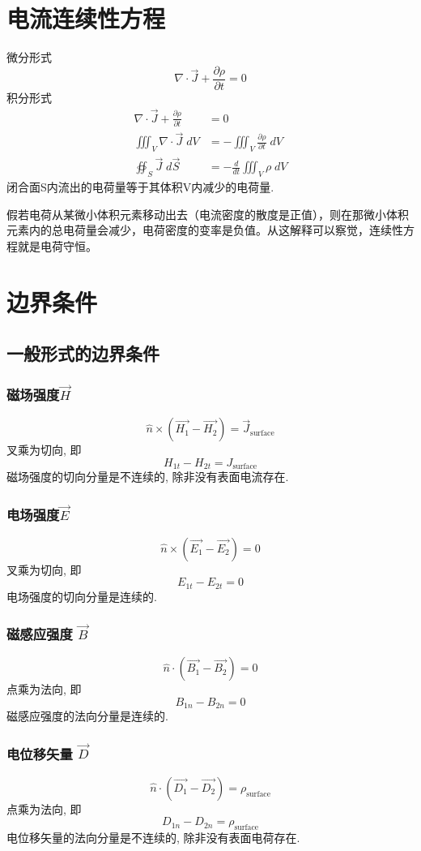 \documentclass[a4paper]{report}
\begin{document}
\section{电流连续性方程}
微分形式
$$\nabla\cdot \vec{J}+ \frac{\partial \rho }{\partial t}=0$$
积分形式
\begin{align*}
    \nabla\cdot \vec{J}+ \frac{\partial \rho }{\partial t}&=0\\
    \iiint_V \nabla\cdot \vec{J} \; dV&=-\iiint_V \frac{\partial \rho }{\partial t} \; dV\\
    \oiint_S \vec{J} \; d\vec{S}&=- \frac{d }{d t}\iiint_V \rho \; dV
\end{align*}
闭合面S内流出的电荷量等于其体积V内减少的电荷量. 
\par 假若电荷从某微小体积元素移动出去（电流密度的散度是正值），则在那微小体积元素内的总电荷量会减少，电荷密度的变率是负值。从这解释可以察觉，连续性方程就是电荷守恒。
\section{边界条件}
\subsection{一般形式的边界条件}
\subsubsection{磁场强度$\vec{H } $}
$$
\hat{n}\times (\vec{H_1}-\vec{H _2}  )=\vec{J}_{\text{surface}}
$$
叉乘为切向, 即
$$H_{1t}-H_{2t}=J_{\text{surface}}$$
磁场强度的切向分量是不连续的, 除非没有表面电流存在. 
\subsubsection{电场强度$\vec{E } $}
$$\hat{n}\times(\vec{E _1}-\vec{E _2}  )=0$$
叉乘为切向, 即
$$E_{1t}-E_{2t}=0$$
电场强度的切向分量是连续的. 
\subsubsection{磁感应强度 $\vec{B }$ }
$$\hat{n}\cdot(\vec{B _1}-\vec{B _2}  )=0$$
点乘为法向, 即
$$B_{1n}-B_{2n}=0$$
磁感应强度的法向分量是连续的. 
\subsubsection{电位移矢量 $\vec{D}$ }
$$\hat{n}\cdot(\vec{D _1}-\vec{D _2}  )=\rho_{\text{surface}}$$
点乘为法向, 即
$$D_{1n}-D_{2n}=\rho_{\text{surface}}$$
电位移矢量的法向分量是不连续的, 除非没有表面电荷存在. 
\end{document}
